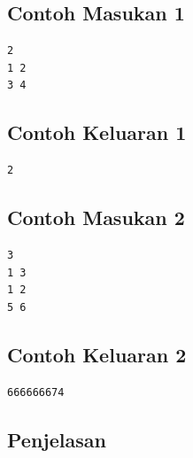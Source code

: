 \documentclass{article}
\begin{document}
\begin{multicols}{2}
\subsection*{Contoh Masukan 1}
\begin{lstlisting}
2
1 2
3 4
\end{lstlisting}
\columnbreak

\subsection*{Contoh Keluaran 1}
\begin{lstlisting}
2
\end{lstlisting}
\vfill
\null
\end{multicols}

\begin{multicols}{2}
\subsection*{Contoh Masukan 2}
\begin{lstlisting}
3
1 3
1 2
5 6
\end{lstlisting}
\columnbreak

\subsection*{Contoh Keluaran 2}
\begin{lstlisting}
666666674
\end{lstlisting}
\vfill
\null
\end{multicols}

\pagebreak
\subsection*{Penjelasan}
\end{document}
